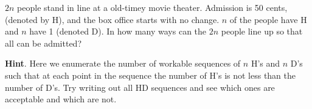 \documentclass{book}
\begin{document}
\setcounter{cpjt}{173}
\addtocounter{cpjt}{-1}
\begin{activity}\label{act-hdseq}
\hypertarget{p-992}{}%
\(2n\) people stand in line at a old-timey movie theater. Admission is 50 cents, (denoted by H), and the box office starts with no change. \(n\) of the people have H and \(n\) have \textdollar{}1 (denoted D). In how many ways can the \(2n\) people line up so that all can be admitted?%
\par\smallskip%
\noindent\textbf{Hint}.\hypertarget{hint-113}{}\quad%
\hypertarget{p-993}{}%
Here we enumerate the number of workable sequences of \(n\) H's and \(n\) D's such that at each point in the sequence the number of H's is not less than the number of D's.  Try writing out all HD sequences and see which ones are acceptable and which are not.%
\par\smallskip%
\noindent\end{activity}

\clearpage
\end{document}

